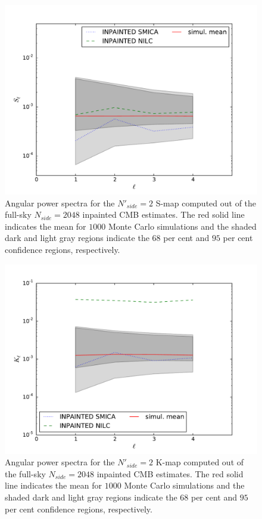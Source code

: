 \begin{figure}
\centering
\includegraphics[width=\textwidth]{figures/chapter-vsk/Inp_Sl.pdf}
\caption{Angular power spectra for the $N'_{side} = 2$ S-map computed out of the full-sky $N_{side} = 2048$ inpainted CMB estimates. The red solid line indicates the mean for $1000$ Monte Carlo simulations and the shaded dark and light gray regions indicate the $68$ per cent and $95$ per cent confidence regions, respectively.}
\label{Fig:1a}
\end{figure}

\begin{figure}
\centering
\includegraphics[width=\textwidth]{figures/chapter-vsk/Inp_Kl.pdf}
\caption{Angular power spectra for the $N'_{side} = 2$ K-map computed out of the full-sky $N_{side} = 2048$ inpainted CMB estimates. The red solid line indicates the mean for $1000$ Monte Carlo simulations and the shaded dark and light gray regions indicate the $68$ per cent and $95$ per cent confidence regions, respectively.}
\label{Fig:1b}
\end{figure}

